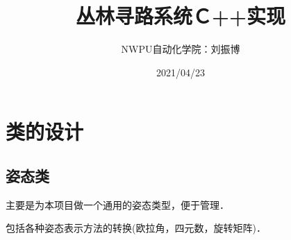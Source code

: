 \documentclass[UTF8]{ctexart}
\title{丛林寻路系统Ｃ++实现}
\author{NWPU自动化学院：刘振博}
\date{2021/04/23}
\begin{document}
\maketitle
\tableofcontents

\newpage

\section{类的设计}

\subsection{姿态类}

主要是为本项目做一个通用的姿态类型，便于管理．

包括各种姿态表示方法的转换(欧拉角，四元数，旋转矩阵)．
\end{document}
